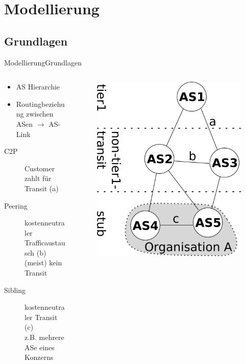 \documentclass[ngerman,compress,hyperref={bookmarks}]{beamer}
\begin{document}

\section{Modellierung}

\subsection{Grundlagen}
\begin{frame}{Modellierung}{Grundlagen}
  \begin{columns}[c]
    \begin{column}{0.7\textwidth}
      \begin{itemize}
        \item AS Hierarchie
        \item Routingbeziehung zwischen ASen $\rightarrow$ AS-Link
      \end{itemize}
      \begin{description}
        \item[C2P] Customer zahlt für Transit (a)
        \item[Peering] kostenneutraler Trafficaustausch (b)\\{\scriptsize (meist) kein Transit}
        \item[Sibling] kostenneutraler Transit (c)\\{\scriptsize z.B. mehrere ASe eines Konzerns}
      \end{description}
    \end{column}
    \begin{column}{0.3\textwidth}
      \begin{figure}
        \includegraphics[width=1\textwidth]{images/Routingbeziehungen}

\end{figure}
\end{column}
\end{columns}
\end{frame}
\end{document}
